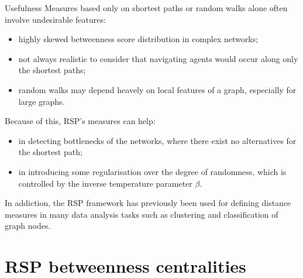 \documentclass[13pt]{beamer}
\begin{document}
    \begin{frame}[t,allowframebreaks]{Usefulness}
    Measures based only on shortest paths or random walks alone often involve undesirable features:
    \begin{itemize}
        \item highly skewed betweenness score distribution in complex networks;

        \item not always realistic to consider that navigating agents would occur along only the shortest paths;

        \item random walks may depend heavely on local features of a graph, especially for large graphs.
    \end{itemize}

    \newpage

    Because of this, RSP's measures can help:
    \begin{itemize}
        \item in detecting bottlenecks of the networks, where there exist no alternatives for the shortest path;

        \item in introducing some regularisation over the degree of randomness, which is controlled by the inverse temperature parameter $\beta$.
    \end{itemize}
    \vspace{0.8em}
    In addiction, the RSP framework has previously been used for defining distance measures in many data analysis tasks such as clustering and classification of graph nodes.
    \end{frame}

    \section{RSP betweenness centralities}
\end{document}
